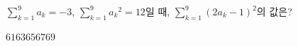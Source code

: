 $\displaystyle\sum_{k=1}^{9} a_k=-3$, $\displaystyle\sum_{k=1}^{9} a_k{}^2=12$일 때, $\displaystyle\sum_{k=1}^{9} (2a_k-1)^2$의 값은?
\begin{choices32}{$61$}{$63$}{$65$}{$67$}{$69$}\end{choices32}

